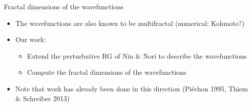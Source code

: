 \documentclass[xcolor=x11names,compress,professionalfonts]{beamer}
\renewcommand{\(}{\begin{columns}}
\renewcommand{\)}{\end{columns}}
\newcommand{\<}[1]{\begin{column}{#1}}
\renewcommand{\>}{\end{column}}
\begin{document}
\begin{frame}{Fractal dimensions of the wavefunctions}
\begin{itemize}
	\item The wavefunctions are also known to be multifractal (numerical: Kohmoto?)
	\item Our work:
	\begin{itemize}
		\item Extend the perturbative RG of Niu \& Nori to describe the wavefunctions
		\item Compute the fractal dimensions of the wavefunctions
	\end{itemize}
	\item Note that work has already been done in this direction (Piéchon 1995, Thiem \& Schreiber 2013)
\end{itemize}
\end{frame}
\end{document}
